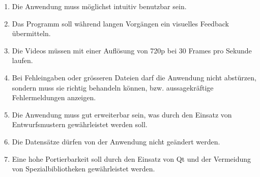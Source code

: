 \begin{enumerate}[label=\bfseries /NF \arabic*0/]
  \item Die Anwendung muss möglichst intuitiv benutzbar sein.
  \item Das Programm soll während langen Vorgängen ein visuelles Feedback übermitteln.
  \item Die Videos müssen mit einer Auflösung  von 720p bei 30 Frames pro Sekunde laufen.
  \item Bei Fehleingaben oder grösseren Dateien darf die Anwendung nicht abstürzen, sondern muss sie richtig behandeln können, bzw. aussagekräftige Fehlermeldungen anzeigen.
  \item Die Anwendung muss gut erweiterbar sein, was durch den Einsatz von Entwurfsmustern gewährleistet werden soll.
  \item Die Datensätze dürfen von der Anwendung nicht geändert werden.
  \item Eine hohe Portierbarkeit soll durch den Einsatz von Qt und der Vermeidung von Spezialbibliotheken gewährleistet werden.
\end{enumerate}
